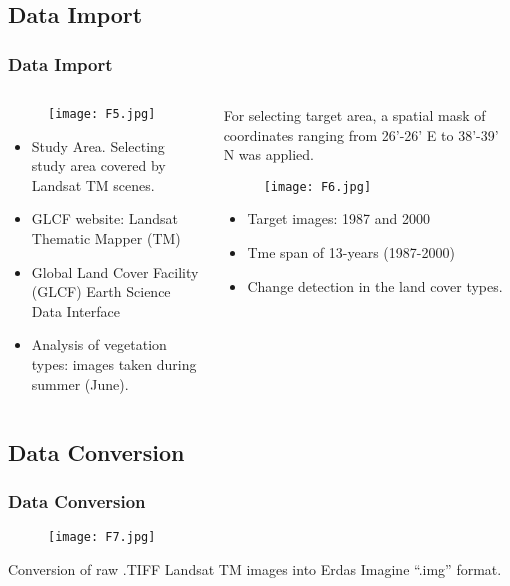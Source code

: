 \documentclass[pdflatex,compress,8pt,
	xcolor={dvipsnames,dvipsnames,svgnames,x11names,table},
	hyperref={colorlinks = true,
	breaklinks = true, 
	urlcolor = NavyBlue, 
	breaklinks = true}]{beamer}
\begin{document}
\subsection{Data Import} 
\begin{frame}\frametitle{Data Import}
\begin{minipage}[0.4\textheight]{\textwidth}
\begin{columns}[T]
\begin{column}{0.5\textwidth}
\vspace{1em}
\begin{figure}[H]
	\centering
		\texttt{[image: F5.jpg]}
\end{figure}
\begin{itemize}
	\item Study Area. Selecting study area covered by Landsat TM scenes.
 	\item GLCF website: Landsat Thematic Mapper (TM)
	\item Global Land Cover Facility (GLCF) Earth Science Data Interface
	\item Analysis of vegetation types: images taken during summer (June). 
\end{itemize}
\end{column}
\begin{column}{0.5\textwidth}
\vspace{1em} 
For selecting target area, a spatial mask of coordinates ranging from 26'-26' E to 38'-39' N was applied. 
\begin{figure}[H]
	\centering
		\texttt{[image: F6.jpg]}
\end{figure}
\begin{itemize}
	\item Target images: 1987 and 2000 
	\item Tme span of 13-years (1987-2000) 
	\item Change detection in the land cover types.
\end{itemize}
\end{column}
\end{columns}
\end{minipage}
\end{frame}

\subsection{Data Conversion}
\begin{frame}\frametitle{Data Conversion}
\begin{figure}[H]
	\centering
		\texttt{[image: F7.jpg]}
\end{figure}
Conversion of raw .TIFF Landsat TM images into Erdas Imagine “.img” format.
\end{frame}
\end{document}
